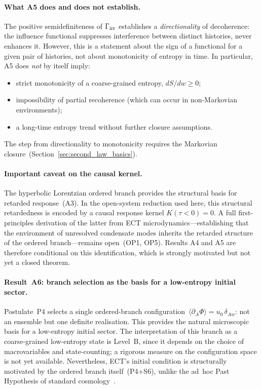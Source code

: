 \documentclass[11pt,a4paper]{article}
\numberwithin{equation}{section}
\begin{document}
\paragraph{What A5 does and does not establish.}
The positive semidefiniteness of $\Gamma_{\rm irr}$ establishes a
\emph{directionality} of decoherence: the influence functional
suppresses interference between distinct histories, never enhances it.
However, this is a statement about the sign of a functional for a
given pair of histories, not about monotonicity of entropy in time.
In particular, A5 does \emph{not} by itself imply:
\begin{itemize}
  \item strict monotonicity of a coarse-grained entropy, $dS/dw\geq 0$;
  \item impossibility of partial recoherence (which can occur in
    non-Markovian environments);
  \item a long-time entropy trend without further closure assumptions.
\end{itemize}
The step from directionality to monotonicity requires the Markovian
closure~(Section~\ref{sec:second_law_basics}).

\paragraph{Important caveat on the causal kernel.}
The hyperbolic Lorentzian ordered branch provides the structural basis
for retarded response~(A3).
In the open-system reduction used here, this structural retardedness
is encoded by a causal response kernel $K(\tau<0)=0$.
A full first-principles derivation of the latter from ECT
microdynamics---establishing that the environment of unresolved
condensate modes inherits the retarded structure of the ordered
branch---remains open~(OP1, OP5).
Results A4 and A5 are therefore conditional on this identification,
which is strongly motivated but not yet a closed theorem.

\paragraph{Result~A6: branch selection as the basis for a
low-entropy initial sector.}
Postulate~P4 selects a single ordered-branch
configuration~$\langle\partial_A\Phi\rangle = u_0\,\delta_{Aw}$:
not an ensemble but one definite realisation.
This provides the natural microscopic basis for a low-entropy initial
sector.
The interpretation of this branch as a coarse-grained low-entropy
state is Level~B, since it depends on the choice of macrovariables
and state-counting; a rigorous measure on the configuration space
is not yet available.
Nevertheless, ECT's initial condition is structurally motivated by
the ordered branch itself~(P4+S6), unlike the ad~hoc Past Hypothesis
of standard cosmology~\cite{Penrose2010}.
\end{document}

